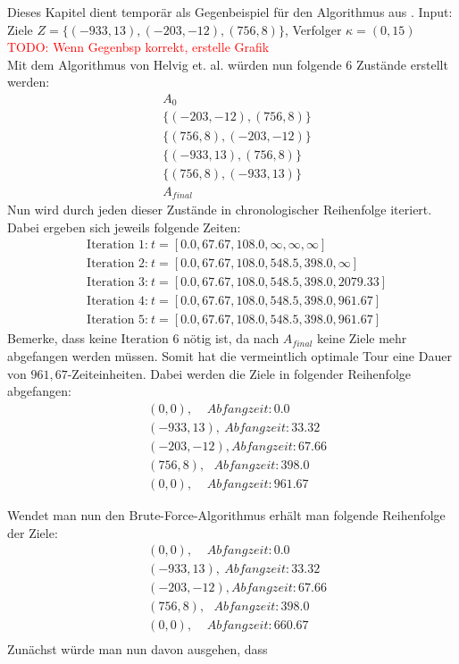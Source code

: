 \documentclass{scrartcl}
\begin{document}
Dieses Kapitel dient temporär als Gegenbeispiel für den Algorithmus aus \cite{helvig}.
Input: Ziele $Z=\{(-933,13),(-203,-12),(756,8)\}$, Verfolger $\kappa=(0,15)$\\
\textcolor{red}{TODO: Wenn Gegenbsp korrekt, erstelle Grafik}\\
Mit dem Algorithmus von Helvig et. al. würden nun folgende 6 Zustände erstellt werden:
\begin{align*}
&A_0\\
&\{(-203,-12), (756,8)\}\\
&\{(756,8), (-203,-12)\}\\
&\{(-933,13), (756,8)\}\\
&\{(756, 8), (-933,13)\}\\
&A_{final}
\end{align*}
Nun wird durch jeden dieser Zustände in chronologischer Reihenfolge iteriert. Dabei ergeben sich jeweils folgende Zeiten:
\begin{align*}
&\text{Iteration 1:}~t=[0.0, 67.67, 108.0, \infty, \infty, \infty] \\
&\text{Iteration 2:}~t=[0.0, 67.67, 108.0, 548.5, 398.0, \infty] \\
&\text{Iteration 3:}~t=[0.0, 67.67, 108.0, 548.5, 398.0, 2079.33] \\
&\text{Iteration 4:}~t=[0.0, 67.67, 108.0, 548.5, 398.0, 961.67] \\
&\text{Iteration 5:}~t=[0.0, 67.67, 108.0, 548.5, 398.0, 961.67] 
\end{align*}
Bemerke, dass keine Iteration $6$ nötig ist, da nach $A_{final}$ keine Ziele mehr abgefangen werden müssen. Somit hat die vermeintlich optimale Tour eine Dauer von $961,67$-Zeiteinheiten. Dabei werden die Ziele in folgender Reihenfolge abgefangen:
\begin{align*}
&(0,0), ~~~~~ Abfangzeit: 0.0 \\
&(-933, 13), ~Abfangzeit: 33.32 \\
&(-203, -12), Abfangzeit: 67.66 \\
&(756, 8), ~~~Abfangzeit: 398.0 \\
&(0, 0), ~~~~~Abfangzeit: 961.67 
\end{align*}

Wendet man nun den Brute-Force-Algorithmus erhält man folgende Reihenfolge der Ziele:
\begin{align*}
&(0, 0), ~~~~~Abfangzeit: 0.0 \\
&(-933, 13), ~Abfangzeit: 33.32 \\
&(-203, -12), Abfangzeit: 67.66 \\
&(756, 8), ~~~Abfangzeit: 398.0 \\
&(0, 0), ~~~~~Abfangzeit: 660.67 \\
\end{align*}
Zunächst würde man nun davon ausgehen, dass 
\end{document}
